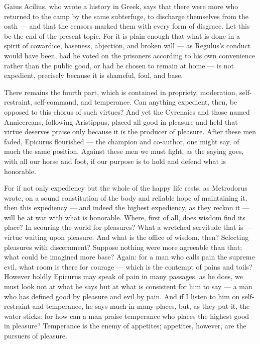  Gaius Acilius, who wrote a history in Greek, says that there were more who returned to the camp by the same subterfuge, to discharge themselves from the oath — and that the censors marked them with every form of disgrace. Let this be the end of the present topic. For it is plain enough that what is done in a spirit of cowardice, baseness, abjection, and broken will — as Regulus's conduct would have been, had he voted on the prisoners according to his own convenience rather than the public good, or had he chosen to remain at home — is not expedient, precisely because it is shameful, foul, and base.

 There remains the fourth part, which is contained in propriety, moderation, self-restraint, self-command, and temperance. Can anything expedient, then, be opposed to this chorus of such virtues? And yet the Cyrenaics and those named Annicereans, following Aristippus, placed all good in pleasure and held that virtue deserves praise only because it is the producer of pleasure. After these men faded, Epicurus flourished — the champion and co-author, one might say, of much the same position. Against these men we must fight, as the saying goes, with all our horse and foot, if our purpose is to hold and defend what is honorable.

 For if not only expediency but the whole of the happy life rests, as Metrodorus wrote, on a sound constitution of the body and reliable hope of maintaining it, then this expediency — and indeed the highest expediency, as they reckon it — will be at war with what is honorable. Where, first of all, does wisdom find its place? In scouring the world for pleasures? What a wretched servitude that is — virtue waiting upon pleasure. And what is the office of wisdom, then? Selecting pleasures with discernment? Suppose nothing were more agreeable than that; what could be imagined more base? Again: for a man who calls pain the supreme evil, what room is there for courage — which is the contempt of pains and toils? However boldly Epicurus may speak of pain in many passages, as he does, we must look not at what he says but at what is consistent for him to say — a man who has defined good by pleasure and evil by pain. And if I listen to him on self-restraint and temperance, he says much in many places, but, as they put it, the water sticks: for how can a man praise temperance who places the highest good in pleasure? Temperance is the enemy of appetites; appetites, however, are the pursuers of pleasure.

